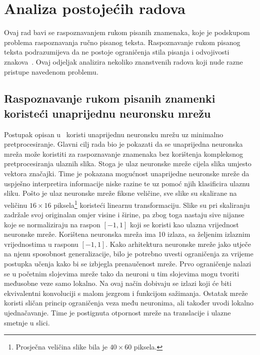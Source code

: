 \section{Analiza postojećih radova}
\label{sec:analiza-postojecih-radova}
Ovaj rad bavi se raspoznavanjem rukom pisanih znamenaka, koje je podskupom problema raspoznavanja ručno pisanog teksta.
Raspoznavanje rukom pisanog teksta podrazumijeva da ne postoje ograničenja stila pisanja i odvojivosti
znakova\ \citep{mantas1986}. Ovaj odjeljak analizira nekoliko znanstvenih radova koji nude razne pristupe navedenom
problemu.

\subsection{Raspoznavanje rukom pisanih znamenki koristeći unaprijednu neuronsku mrežu}
\label{subsec:raspoznavanje-rukom-pisanih-znakova-koristeci-unaprijednu-neuronsku-mrezu}
Postupak opisan u\ \citep{leCun1990} koristi unaprijednu neuronsku mrežu uz minimalno pretprocesiranje. Glavni cilj rada
bio je pokazati da se unaprijedna neuronska mreža može koristiti za raspoznavanje znamenaka bez korištenja kompleksnog
pretprocesiranja ulaznih slika. Stoga je ulaz neuronske mreže cijela slika umjesto vektora značajki. Time je pokazana
mogućnost unaprijedne neuronske mreže da uspješno interpretira informacije niske razine te uz pomoć njih klasificira
ulaznu sliku. Pošto je ulaz neuronske mreže fiksne veličine, sve slike su skalirane na veličinu $16 \times 16$
piksela\footnote{Prosječna veličina slike bila je $40 \times 60$ piksela.} koristeći linearnu transformaciju. Slike su
pri skaliranju zadržale svoj originalan omjer visine i širine, pa zbog toga nastaju sive nijanse koje se normaliziraju
na raspon $[-1, 1]$ koji se koristi kao ulazna vrijednost neuronske mreže. Korištena neuronska mreža ima 10 izlaza, sa
željenim izlaznim vrijednostima u rasponu $[-1, 1]$. Kako arhitektura neuronske mreže jako utječe na njenu sposobnost
generalizacije, bilo je potrebno uvesti ograničenja za vrijeme postupka učenja kako bi se izbjegla prenaučenost mreže.
Prvo ograničenje nalazi se u početnim slojevima mreže tako da neuroni u tim slojevima mogu tvoriti međusobne veze
samo lokalno. Na ovaj način dobivaju se izlazi koji će biti ekvivalentni konvoluciji s malom jezgrom i funkcijom
sažimanja. Ostatak mreže koristi sličan princip ograničenja veza među neuronima, ali također uvodi lokalno
ujednačavanje. Time je postignuta otpornost mreže na translacije i ulazne smetnje u slici.\\
